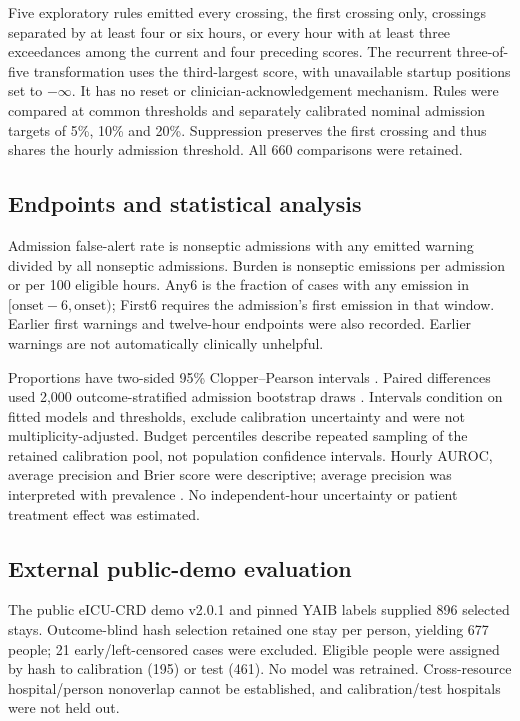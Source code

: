 \documentclass[preprint,12pt]{elsarticle}
\newcommand{\anysix}{Any6}
\newcommand{\firstsix}{First6}
\begin{document}
Five exploratory rules emitted every crossing, the first crossing only, crossings separated by at least four or six hours, or every hour with at least three exceedances among the current and four preceding scores. The recurrent three-of-five transformation uses the third-largest score, with unavailable startup positions set to $-\infty$. It has no reset or clinician-acknowledgement mechanism. Rules were compared at common thresholds and separately calibrated nominal admission targets of 5\%, 10\% and 20\%. Suppression preserves the first crossing and thus shares the hourly admission threshold. All 660 comparisons were retained.

\subsection{Endpoints and statistical analysis}
Admission false-alert rate is nonseptic admissions with any emitted warning divided by all nonseptic admissions. Burden is nonseptic emissions per admission or per 100 eligible hours. \anysix{} is the fraction of cases with any emission in $[\mathrm{onset}-6,\mathrm{onset})$; \firstsix{} requires the admission's first emission in that window. Earlier first warnings and twelve-hour endpoints were also recorded. Earlier warnings are not automatically clinically unhelpful.

Proportions have two-sided 95\% Clopper--Pearson intervals \cite{clopper}. Paired differences used 2,000 outcome-stratified admission bootstrap draws \cite{efron}. Intervals condition on fitted models and thresholds, exclude calibration uncertainty and were not multiplicity-adjusted. Budget percentiles describe repeated sampling of the retained calibration pool, not population confidence intervals. Hourly AUROC, average precision and Brier score were descriptive; average precision was interpreted with prevalence \cite{saito}. No independent-hour uncertainty or patient treatment effect was estimated.

\subsection{External public-demo evaluation}
The public eICU-CRD demo v2.0.1 \cite{eicudemo,eicu} and pinned YAIB labels \cite{yaib} supplied 896 selected stays. Outcome-blind hash selection retained one stay per person, yielding 677 people; 21 early/left-censored cases were excluded. Eligible people were assigned by hash to calibration (195) or test (461). No model was retrained. Cross-resource hospital/person nonoverlap cannot be established, and calibration/test hospitals were not held out.
\end{document}
